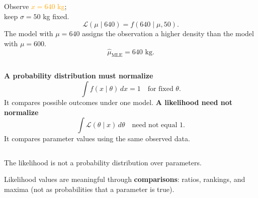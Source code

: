 \documentclass[12pt]{beamer}
\newcommand{\lik}{\mathcal{L}}
\newcommand{\fixed}[1]{\textcolor{orange}{#1}}
\begin{document}
\begin{frame}{}
\footnotesize

\begin{block}{}
\small
\begin{columns}[c,onlytextwidth]


Observe \fixed{$x=640$ kg};\\
keep $\sigma=50$ kg fixed.
\[
\lik(\mu\mid640)=f(640\mid\mu,50).
\]
The model with $\mu=640$ assigns the observation a higher density than the model with $\mu=600$.
\[
\hat\mu_{\text{MLE}}=640\text{ kg}.
\]
\end{columns}
\end{block}
\end{frame}

\begin{frame}{}

\begin{block}{}

\begin{columns}[T,onlytextwidth]
\textbf{A probability distribution must normalize}
\[
\int f(x\mid\theta)\,dx=1
\quad\text{for fixed }\theta.
\]
It compares possible outcomes under one model.
\textbf{A likelihood need not normalize}
\[
\int \lik(\theta\mid x)\,d\theta
\quad\text{need not equal }1.
\]
It compares parameter values using the same observed data.
\end{columns}
\vspace{0.55cm}
\begin{block}{}
The likelihood is not a probability distribution over parameters.

Likelihood values are meaningful through \textbf{comparisons}: ratios, rankings, and maxima (not as probabilities that a parameter is true).
\end{block}
\end{block}
\end{frame}
\end{document}
